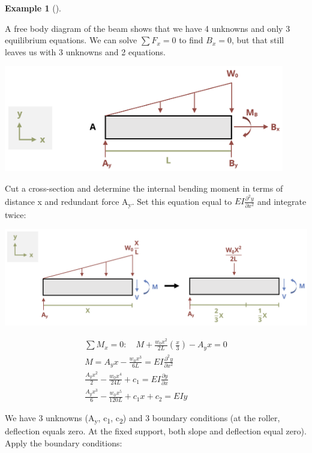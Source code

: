 \documentclass[
  letterpaper,
  DIV=11,
  numbers=noendperiod]{scrreprt}
\theoremstyle{definition}
\newtheorem{example}{Example}[chapter]
\theoremstyle{remark}
\begin{document}
\begin{tcolorbox}
\begin{example}[]
\begin{tcolorbox}
A free body diagram of the beam shows that we have 4 unknowns and only 3
equilibrium equations. We can solve \(\sum F_x=0\) to find \(B_x = 0\),
but that still leaves us with 3 unknowns and 2 equations.

\begin{center}
\includegraphics[width=4.82292in,height=\textheight]{images/CH11 PNGs/example11.6-2.png}
\end{center}

Cut a cross-section and determine the internal bending moment in terms
of distance x and redundant force A\textsubscript{y}. Set this equation
equal to \(EI\frac{\partial^2 y}{\partial x^2}\) and integrate twice:

\begin{center}
\includegraphics{images/CH11 PNGs/example11.6-3.png}
\end{center}

\[
\begin{gathered} \sum M_x=0: \quad M+\frac{w_0 x^2}{2 L}\left(\frac{x}{3}\right)-A_y x=0 \\ M=A_y x-\frac{w_0 x^3}{6 L}=EI \frac{\partial^2 y}{\partial x^2} \\ \frac{A_y x^2}{2}-\frac{w_0 x^4}{24 L}+c_1=E I \frac{\partial y}{\partial x} \\ \frac{A_y x^3}{6}-\frac{w_0 x^5}{120 L}+c_1 x+c_2=E I y\end{gathered}
\]

We have 3 unknowns (A\textsubscript{y}, c\textsubscript{1},
c\textsubscript{2}) and 3 boundary conditions (at the roller, deflection
equals zero. At the fixed support, both slope and deflection equal
zero). Apply the boundary conditions:


\end{tcolorbox}
\end{example}
\end{tcolorbox}
\end{document}
